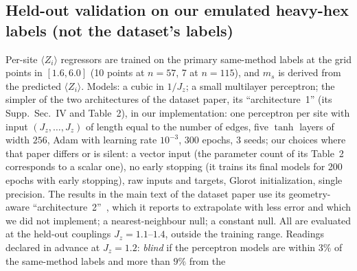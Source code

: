 \documentclass[aps,prx,onecolumn,10pt,nofootinbib,longbibliography,floatfix]{revtex4-2}
\theoremstyle{remark}
\newcommand{\Jz}{J_z}
\newcommand{\ms}{m_s}
\begin{document}
\subsection{Held-out validation on our emulated heavy-hex labels (not the dataset's labels)}
\label{sm:heldout}

Per-site $\langle Z_i\rangle$ regressors are trained on the primary same-method labels at the grid points in
$[1.6,6.0]$ (10 points at $n=57$, 7 at $n=115$), and $\ms$ is derived from the predicted $\langle Z_i\rangle$. Models: a %
cubic in $1/\Jz$; a small multilayer perceptron; the simpler of the two architectures of the dataset paper, its %
``architecture~1'' (its Supp.\ Sec.~IV and Table~2), in our implementation: one perceptron per site with input %
$(\Jz,\dots,\Jz)$ of length equal to the number of edges, five $\tanh$ layers of width $256$, Adam with learning %
rate $10^{-3}$, 300 epochs, 3 seeds; our choices where that paper differs or is silent: a vector input (the %
parameter count of its Table~2 corresponds to a scalar one), no early stopping (it trains its final models for %
200 epochs with early stopping), raw inputs and targets, Glorot initialization, single precision. The results in %
the main text of the dataset paper use its geometry-aware ``architecture~2''~\cite{wanner2024}, which it reports %
to extrapolate with less error and which we did not implement; a nearest-neighbour null; a constant null. All are evaluated at
the held-out couplings $\Jz=1.1$--$1.4$, outside the training range. Readings declared in advance at $\Jz=1.2$: %
\emph{blind} if the perceptron models are within $3\%$ of the same-method labels and more than $9\%$ from the %
\end{document}
